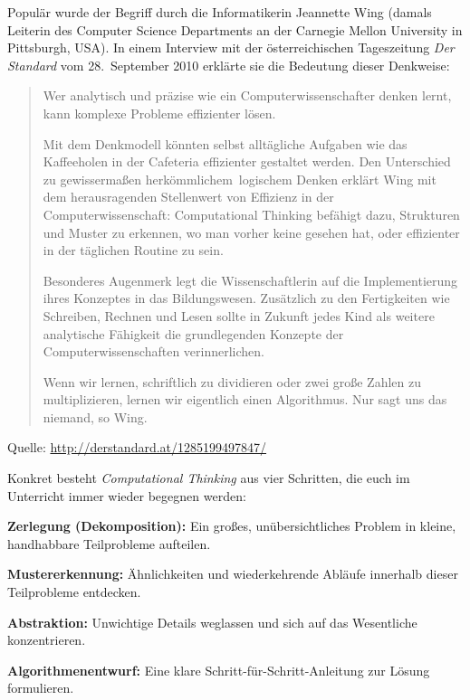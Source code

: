 Populär wurde der Begriff durch die Informatikerin Jeannette Wing (damals Leiterin
des Computer Science Departments an der Carnegie Mellon University in Pittsburgh,
USA). In einem Interview mit der österreichischen Tageszeitung \emph{Der Standard}
vom 28.\ September 2010 erklärte sie die Bedeutung dieser Denkweise:

\begin{quotation}
\noindent Wer analytisch und präzise wie ein Computerwissenschafter denken
lernt, kann komplexe Probleme effizienter lösen.

\noindent Mit dem Denkmodell könnten selbst alltägliche Aufgaben wie das
Kaffeeholen in der Cafeteria effizienter gestaltet werden. Den Unterschied zu
gewissermaßen \glqq herkömmlichem\grqq\ logischem Denken erklärt Wing mit dem
herausragenden Stellenwert von Effizienz in der Computerwissenschaft:
\glqq Computational Thinking befähigt dazu, Strukturen und Muster zu erkennen,
wo man vorher keine gesehen hat, oder effizienter in der täglichen Routine zu
sein.\grqq

\noindent Besonderes Augenmerk legt die Wissenschaftlerin auf die
Implementierung ihres Konzeptes in das Bildungswesen. \glqq Zusätzlich zu den
Fertigkeiten wie Schreiben, Rechnen und Lesen sollte in Zukunft jedes Kind als
weitere analytische Fähigkeit die grundlegenden Konzepte der
Computerwissenschaften verinnerlichen\grqq .

\noindent \glqq Wenn wir lernen, schriftlich zu dividieren oder zwei große
Zahlen zu multiplizieren, lernen wir eigentlich einen Algorithmus. Nur sagt uns
das niemand\grqq , so Wing.
\end{quotation}

\noindent Quelle: \url{http://derstandard.at/1285199497847/}

\medskip
\noindent Konkret besteht \emph{Computational Thinking} aus vier Schritten, die
euch im Unterricht immer wieder begegnen werden:
\begin{compactenum}[1.]
\item \textbf{Zerlegung (Dekomposition):} Ein großes, unübersichtliches Problem in
kleine, handhabbare Teilprobleme aufteilen.
\item \textbf{Mustererkennung:} Ähnlichkeiten und wiederkehrende Abläufe innerhalb
dieser Teilprobleme entdecken.
\item \textbf{Abstraktion:} Unwichtige Details weglassen und sich auf das
Wesentliche konzentrieren.
\item \textbf{Algorithmenentwurf:} Eine klare Schritt-für-Schritt-Anleitung zur
Lösung formulieren.
\end{compactenum}
